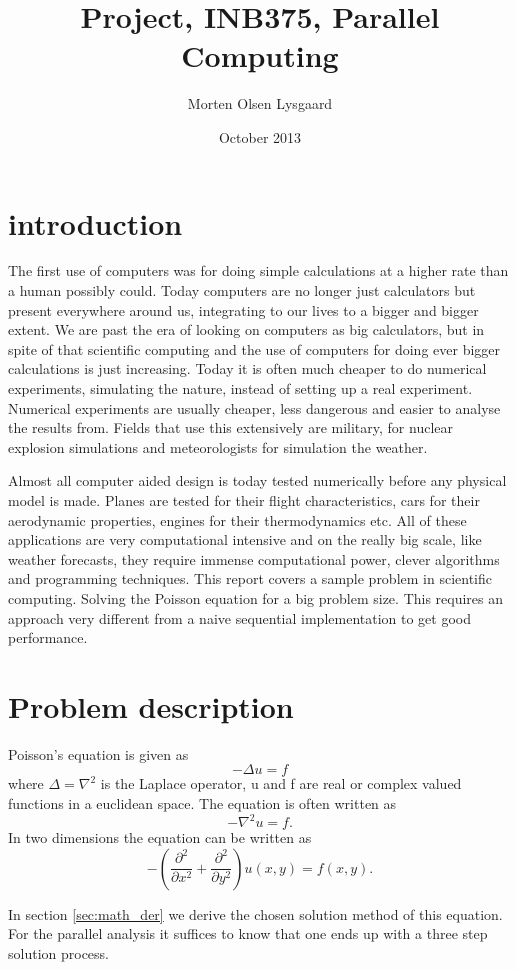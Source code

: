 \documentclass{article}
\title{Project, INB375, Parallel Computing}
\author{Morten Olsen Lysgaard}
\date{October 2013}
\newcommand{\dd}[2]{\ensuremath{\frac{\partial^2 #1}{\partial #2^2}}}
\begin{document}
\maketitle

\section{introduction}
The first use of computers was for doing simple calculations at a higher rate
than a human possibly could. Today computers are no longer just calculators but
present everywhere around us, integrating to our lives to a bigger and bigger extent.
We are past the era of looking on computers as big calculators, but in spite of that
scientific computing and the use of computers for doing ever bigger calculations is just increasing.
Today it is often much cheaper to do numerical experiments, simulating the nature, instead of
setting up a real experiment. Numerical experiments are usually cheaper, less
dangerous and easier to analyse the results from. Fields that use this extensively
are military, for nuclear explosion simulations and meteorologists for simulation the weather.

Almost all computer aided design is today tested numerically before any physical model is made.
Planes are tested for their flight characteristics, cars for their aerodynamic properties, engines
for their thermodynamics etc. All of these applications are very computational intensive and on the
really big scale, like weather forecasts, they require immense computational power, clever algorithms
and programming techniques. This report covers a sample problem in scientific computing. Solving the
Poisson equation for a big problem size. This requires an approach very different from a naive
sequential implementation to get good performance.

\section{Problem description}
\label{sec:sol_steps}
Poisson's equation is given as
\[
-\Delta u = f
\]
where $\Delta = \nabla^2$ is the Laplace operator, u and f are real or complex valued functions in a
euclidean space. The equation is often written as
\[
-\nabla^2 u = f.
\]
In two dimensions the equation can be written as
\[
-\left( \dd{}{x} + \dd{}{y} \right) u(x,y) = f(x,y).
\]

In section \ref{sec:math_der} we derive the chosen solution method of this equation. 
For the parallel analysis it suffices to know that one ends up with a three step solution
process.
\end{document}
